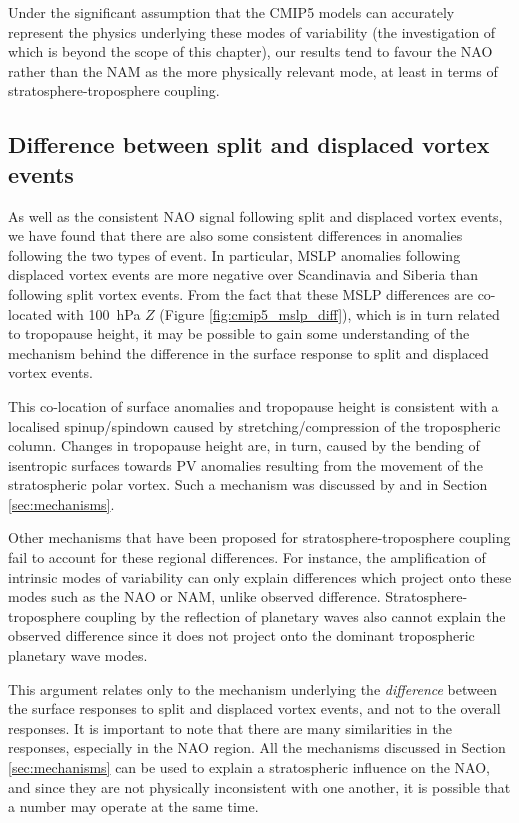 Under the significant assumption that the CMIP5 models can accurately represent
the physics underlying these modes of variability (the investigation of which is
beyond the scope of this chapter), our results tend to favour the NAO rather
than the NAM as the more physically relevant mode, at least in terms of
stratosphere-troposphere coupling.





\subsection{Difference between split and displaced vortex events}
\label{sec:cmip5_discuss_split_displ}

As well as the consistent NAO signal following split and displaced vortex
events, we have found that there are also some consistent differences in
anomalies following the two types of event. In particular, MSLP anomalies
following displaced vortex events are more negative over Scandinavia and Siberia
than following split vortex events. From the fact that these MSLP differences
are co-located with 100~hPa $Z$ (Figure \ref{fig:cmip5_mslp_diff}), which is in
turn related to tropopause height, it may be possible to gain some understanding
of the mechanism behind the difference in the surface response to split and
displaced vortex events. 

This co-location of surface anomalies and tropopause height is consistent with a
localised spinup/spindown caused by stretching/compression of the tropospheric
column. Changes in tropopause height are, in turn, caused by the bending of
isentropic surfaces towards PV anomalies resulting from the movement of the
stratospheric polar vortex. Such a mechanism was discussed by \citet{Ambaum2002}
and in Section \ref{sec:mechanisms}.

Other mechanisms that have been proposed for stratosphere-troposphere coupling
fail to account for these regional differences. For instance, the amplification
of intrinsic modes of variability \citep{Robinson1991} can only explain
differences which project onto these modes such as the NAO or NAM, unlike
observed difference. Stratosphere-troposphere coupling by the reflection of
planetary waves \citep{JudithPerlwitz2003,Shaw2010} also cannot explain the
observed difference since it  does not project onto the dominant tropospheric
planetary wave modes. 

This argument relates only to the mechanism underlying the \emph{difference}
between the surface responses to split and displaced vortex events, and not to
the overall responses. It is important to note that there are many similarities
in the responses, especially in the NAO region. All the mechanisms discussed in
Section \ref{sec:mechanisms} can be used to explain a stratospheric influence on
the NAO, and since they are not physically inconsistent with one another, it is
possible that a number may operate at the same time.

